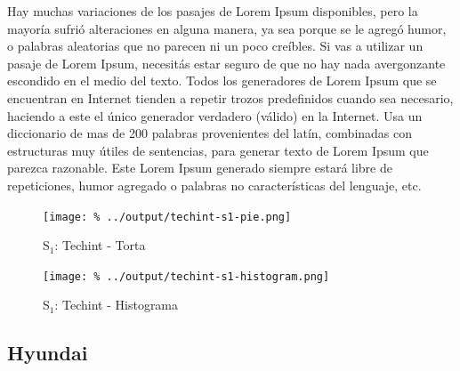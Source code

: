 \documentclass[final,narroweqnarray,inline]{ieee}
\begin{document}
Hay muchas variaciones de los pasajes de Lorem Ipsum disponibles, pero la mayoría sufrió alteraciones en alguna manera, ya sea porque se le agregó humor, o palabras aleatorias que no parecen ni un poco creíbles. Si vas a utilizar un pasaje de Lorem Ipsum, necesitás estar seguro de que no hay nada avergonzante escondido en el medio del texto. Todos los generadores de Lorem Ipsum que se encuentran en Internet tienden a repetir trozos predefinidos cuando sea necesario, haciendo a este el único generador verdadero (válido) en la Internet. Usa un diccionario de mas de 200 palabras provenientes del latín, combinadas con estructuras muy útiles de sentencias, para generar texto de Lorem Ipsum que parezca razonable. Este Lorem Ipsum generado siempre estará libre de repeticiones, humor agregado o palabras no características del lenguaje, etc.

    \begin{figure}[ht]\begin{center}
      \texttt{[image: \%
      ../output/techint-s1-pie.png]}
      \vspace{-2em}
      \caption{S$_1$: Techint - Torta}
      \label{techint-s1-pie}
    \end{center}\end{figure}

    \begin{figure}[ht]\begin{center}
      \texttt{[image: \%
      ../output/techint-s1-histogram.png]}
      \vspace{-2em}
      \caption{S$_1$: Techint - Histograma}
      \label{techint-s1-histogram}
    \end{center}\end{figure}


  \subsection{Hyundai}
\end{document}
